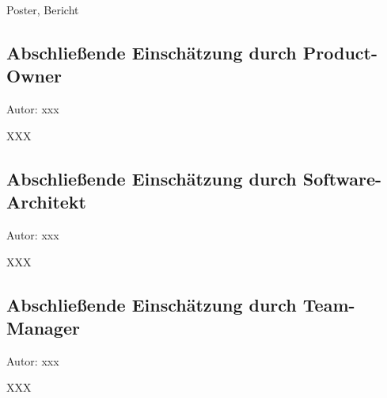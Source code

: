 \documentclass[twoside]{report}
\begin{document}
Poster, Bericht

\subsection{Abschließende Einschätzung durch Product-Owner}
{\small Autor: xxx}

XXX

\subsection{Abschließende Einschätzung durch Software-Architekt}
{\small Autor: xxx}

XXX

\subsection{Abschließende Einschätzung durch Team-Manager}
{\small Autor: xxx}

XXX
\end{document}
